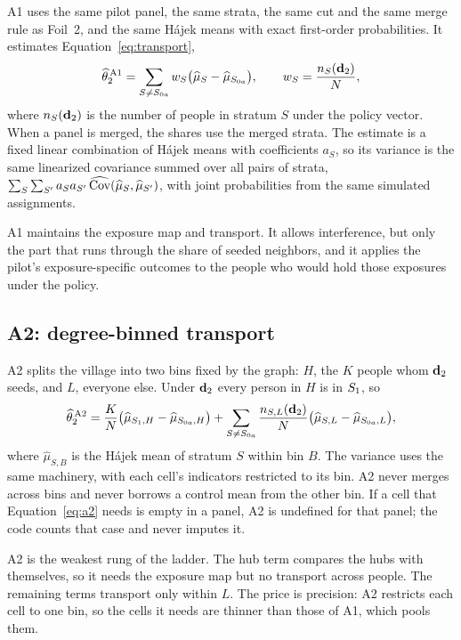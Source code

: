 A1 uses the same pilot panel, the same strata, the same cut and the same merge
rule as Foil~2, and the same H\'ajek means with exact first-order probabilities.
It estimates Equation~\eqref{eq:transport},
\begin{equation}\label{eq:a1}
  \widehat\theta_2^{\,\mathrm{A1}}
  =\sum_{S\neq S_{0a}} w_S\bigl(\widehat\mu_S-\widehat\mu_{S_{0a}}\bigr),
  \qquad w_S=\frac{n_S(\mathbf{d}_2)}{N},
\end{equation}
where $n_S(\mathbf{d}_2)$ is the number of people in stratum $S$ under the policy vector.
When a panel is merged, the shares use the merged strata. The estimate is a fixed
linear combination of H\'ajek means with coefficients $a_S$, so its variance is
the same linearized covariance summed over all pairs of strata,
$\sum_S\sum_{S'}a_S a_{S'}\,\widehat{\operatorname{Cov}}(\widehat\mu_S,\widehat\mu_{S'})$, with
joint probabilities from the same simulated assignments.

A1 maintains the exposure map and transport. It allows interference, but only
the part that runs through the share of seeded neighbors, and it applies the
pilot's exposure-specific outcomes to the people who would hold those exposures
under the policy.

\subsection{A2: degree-binned transport}\label{sec:a2}

A2 splits the village into two bins fixed by the graph: $H$, the $K$ people whom
$\mathbf{d}_2$ seeds, and $L$, everyone else. Under $\mathbf{d}_2$ every person in $H$ is in
$S_{1}$, so
\begin{equation}\label{eq:a2}
  \widehat\theta_2^{\,\mathrm{A2}}
  =\frac{K}{N}\bigl(\widehat\mu_{S_{1},H}-\widehat\mu_{S_{0a},H}\bigr)
   +\sum_{S\neq S_{0a}}\frac{n_{S,L}(\mathbf{d}_2)}{N}\bigl(\widehat\mu_{S,L}-\widehat\mu_{S_{0a},L}\bigr),
\end{equation}
where $\widehat\mu_{S,B}$ is the H\'ajek mean of stratum $S$ within bin $B$. The
variance uses the same machinery, with each cell's indicators restricted to its
bin. A2 never merges across bins and never borrows a control mean from the other
bin. If a cell that Equation~\eqref{eq:a2} needs is empty in a panel, A2 is
undefined for that panel; the code counts that case and never imputes it.

A2 is the weakest rung of the ladder. The hub term compares the hubs with
themselves, so it needs the exposure map but no transport across people. The
remaining terms transport only within $L$. The price is precision: A2 restricts
each cell to one bin, so the cells it needs are thinner than those of A1, which
pools them.

